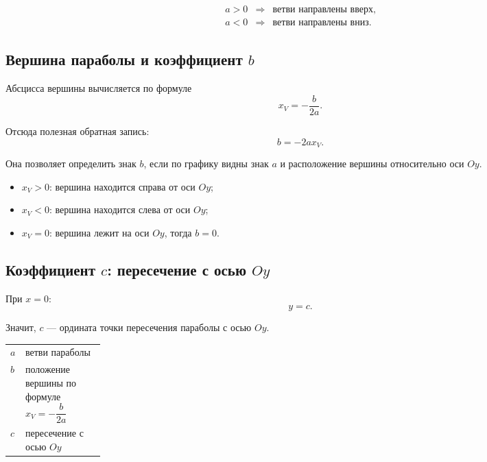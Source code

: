 \documentclass[a4paper,12pt]{article}
\begin{document}
\[
\begin{array}{ccl}
a>0
&
\Longrightarrow
&
\text{ветви направлены вверх},
\\[2mm]
a<0
&
\Longrightarrow
&
\text{ветви направлены вниз}.
\end{array}
\]

\subsection*{Вершина параболы и коэффициент $b$}

Абсцисса вершины вычисляется по формуле
\[
\boxed{x_V=-\frac{b}{2a}}.
\]

Отсюда полезная обратная запись:
\[
\boxed{b=-2ax_V}.
\]

Она позволяет определить знак $b$, если по графику видны знак $a$
и расположение вершины относительно оси $Oy$.

\begin{itemize}
  \item $x_V>0$: вершина находится справа от оси $Oy$;
  \item $x_V<0$: вершина находится слева от оси $Oy$;
  \item $x_V=0$: вершина лежит на оси $Oy$, тогда $b=0$.
\end{itemize}

\subsection*{Коэффициент $c$: пересечение с осью $Oy$}

При $x=0$:
\[
y=c.
\]

Значит, $c$ --- ордината точки пересечения параболы с осью $Oy$.

\begin{center}
\begin{tabularx}{0.88\linewidth}{@{}>{\bfseries}p{0.16\linewidth}X@{}}
\toprule
$a$ & ветви параболы \\
$b$ & положение вершины по формуле $x_V=-\dfrac{b}{2a}$ \\
$c$ & пересечение с осью $Oy$ \\
\bottomrule
\end{tabularx}
\end{center}
\end{document}
